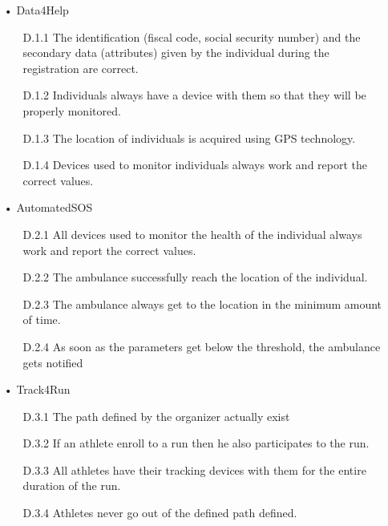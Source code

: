 \begin{enumerate}
\item[•] {\Large Data4Help}
	\begin{enumerate}
	\item [D.1.1] The identification (fiscal code, social security number) and the secondary data (attributes) given by the individual during the registration are correct.
    \item [D.1.2] Individuals always have a device with them so that they will be properly monitored.
    \item [D.1.3] The location of individuals is acquired using GPS technology.
    \item [D.1.4] Devices used to monitor individuals always work and report the correct values.
	
	\end{enumerate}
	
\item[•] {\Large AutomatedSOS}
	\begin{enumerate}
	\item [D.2.1] All devices used to monitor the health of the individual always work and report the correct values.
    \item [D.2.2] The ambulance successfully reach the location of the individual.
    \item [D.2.3] The ambulance always get to the location in the minimum amount of time.
    \item [D.2.4] As soon as the parameters get below the threshold, the ambulance gets notified

	\end{enumerate}
\item[•] {\Large Track4Run}
	\begin{enumerate}
	\item [D.3.1] The path defined by the organizer actually exist
    \item [D.3.2] If an athlete enroll to a run then he also participates to the run.
    \item [D.3.3] All athletes have their tracking devices with them for the entire duration of the run.
    \item [D.3.4] Athletes never go out of the defined path defined.
	\end{enumerate}
	
\end{enumerate}